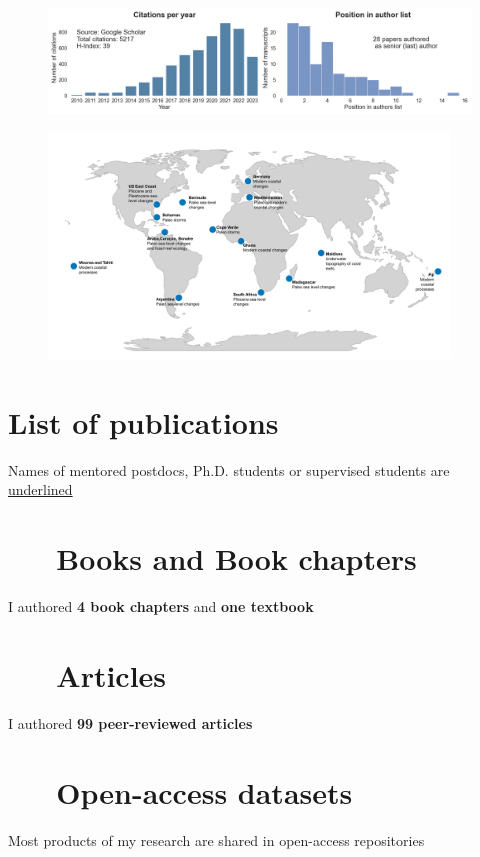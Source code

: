 \documentclass[%
               doublesided,
               paper=a4,
               fontsize=10pt
              ]{my-resume}
\begin{document}
\begin{figure}[h]
\centering
\includegraphics[width=\textwidth]{img/citations_authors.png} 
\end{figure}

\begin{figure}[h]
\centering
\includegraphics[width=0.95\textwidth]{Research_map/field_data.pdf} 
\end{figure}

\clearpage

\pagestyle{empty}

\section[\faAreaChart]{List of publications}
Names of mentored postdocs, Ph.D. students or supervised students are \underline{underlined}

\nocite{*}
\section{\faBook \ \ \ Books and Book chapters}
I authored \textbf{4 book chapters} and \textbf{one textbook}
\printbibliography[type=book,heading=none]
\section{\faFileTextO \ \ \  Articles}
I authored \textbf{99 peer-reviewed articles}
\printbibliography[type=article,heading=none]
\section{\faFileTextO \ \ \  Open-access datasets}
Most products of my research are shared in open-access repositories
\printbibliography[type=dataset,heading=none]


\end{document}
